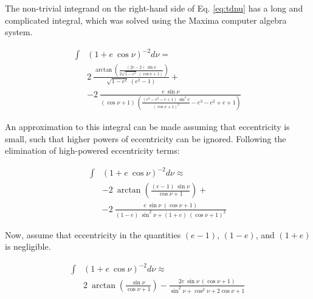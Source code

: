 The non-trivial integrand on the right-hand side of Eq. \ref{eq:tdnu} has a long and complicated integral, which was solved using the Maxima computer algebra system\footnotemark {}. 

\begin{equation}
\label{eq:dnu}
	\begin{split}
		\int & \left(1+e\:\cos\nu\right)^{-2} d\nu = \\ 
			& 2\:\frac{\arctan \left( 
				\frac{(2e-2)\:\sin\nu}{2\sqrt{1-e^2}\:(\cos\nu +1)}
			    \right)}
			             {\sqrt{1-e^2}\:(e^2-1)} + \\
			& -2 \:\frac{e\:\sin\nu}
			    {(\cos\nu +1) \:\left(  
			    	\frac{(e^3-e^2-e+1)\:\sin^2\nu}{(\cos\nu +1)^2}
			    	- e^3 -e^2 + e + 1
			    \right) }
	\end{split}
\end{equation}

An approximation to this integral can be made assuming that eccentricity is small, such that higher powers of eccentricity can be ignored. 
Following the elimination of high-powered eccentricity terms:

\begin{equation}
\label{eq:dnusimpa}
	\begin{split}
		\int & \left(1+e\:\cos\nu\right)^{-2} d\nu \approx \\ 
			& -2\:\arctan \left( 
				\frac{(e-1)\:\sin\nu}{\cos\nu +1}
			    \right) + \\
			& -2\:\frac{e\:\sin\nu\:(\cos\nu +1)}
			    {(1-e)\:\sin^2\nu + (1+e)\:(\cos\nu +1)^2}
	\end{split}
\end{equation}

\noindent Now, assume that eccentricity in the quantities $(e-1)$, $(1-e)$, and $(1+e)$ is negligible.

\begin{equation}
\label{eq:dnusimpb}
	\begin{split}
		\int & \left(1+e\:\cos\nu\right)^{-2} d\nu \approx \\ 
			& 2\:\arctan \left( 
				\frac{\sin\nu}{\cos\nu +1}
			    \right) - \frac{2e\:\sin\nu\:(\cos\nu +1)}
			    {\sin^2\nu + \cos^2\nu + 2\cos\nu + 1}
	\end{split}
\end{equation}

